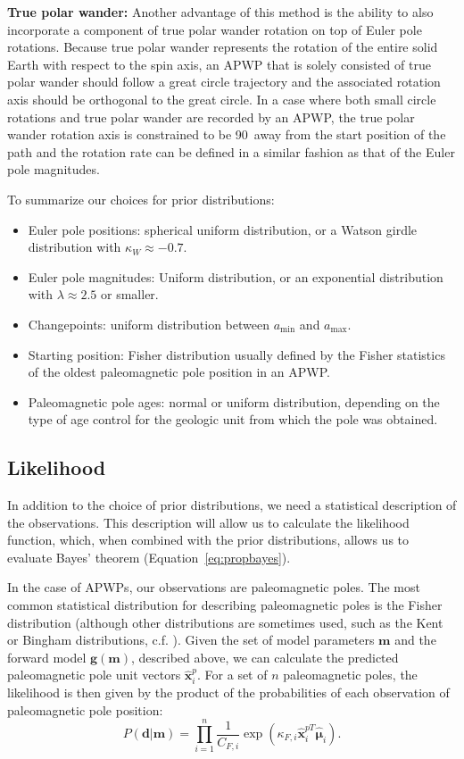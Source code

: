 \documentclass[]{agujournal2019}
\begin{document}
\textbf{True polar wander:}
Another advantage of this method is the ability to also incorporate a component of true polar wander rotation on top of Euler pole rotations. Because true polar wander represents the rotation of the entire solid Earth with respect to the spin axis, an APWP that is solely consisted of true polar wander should follow a great circle trajectory and the associated rotation axis should be orthogonal to the great circle. In a case where both small circle rotations and true polar wander are recorded by an APWP, the true polar wander rotation axis is constrained to be 90\textdegree\ away from the start position of the path and the rotation rate can be defined in a similar fashion as that of the Euler pole magnitudes.


To summarize our choices for prior distributions:
\begin{itemize}
\item Euler pole positions: spherical uniform distribution, or a Watson girdle distribution with $\kappa_W \approx -0.7$.
\item Euler pole magnitudes: Uniform distribution, or an exponential distribution with $\lambda \approx 2.5$ or smaller.
\item Changepoints: uniform distribution between $a_\mathrm{min}$ and $a_\mathrm{max}$.
\item Starting position: Fisher distribution usually defined by the Fisher statistics of the oldest paleomagnetic pole position in an APWP.
\item Paleomagnetic pole ages: normal or uniform distribution, depending on the type of age control for the geologic unit from which the pole was obtained.
\end{itemize}

\subsection*{Likelihood}
\label{sec:likelihood}
In addition to the choice of prior distributions, we need a statistical description of the observations. This description will allow us to calculate the likelihood function, which, when combined with the prior distributions, allows us to evaluate Bayes' theorem (Equation~\ref{eq:propbayes}).

In the case of APWPs, our observations are paleomagnetic poles. The most common statistical distribution for describing paleomagnetic poles is the Fisher distribution (although other distributions are sometimes used, such as the Kent or Bingham distributions, c.f. ). Given the set of model parameters $\mathbf{m}$ and the forward model $\mathbf{g}(\mathbf{m})$, described above, we can calculate the predicted paleomagnetic pole unit vectors $\hat{\mathbf{x}}_i^p$. For a set of $n$ paleomagnetic poles, the likelihood is then given by the product of the probabilities of each observation of paleomagnetic pole position:
\begin{equation}
P(\mathbf{d} \vert \mathbf{m}) = \displaystyle\prod_{i=1}^n \frac{1}{C_{F,i}} \exp \left( \kappa_{F,i} \hat{\mathbf{x}}_{i}^{pT} \hat{\mathbf{\mu}}_i \right).
\label{eq:model_likelihood}
\end{equation}
\end{document}
